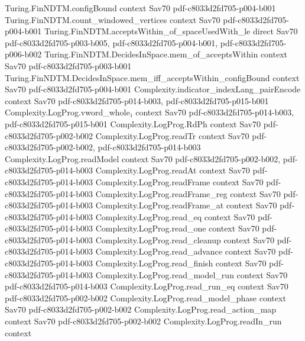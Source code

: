 \begin{theorem}
\proofstep
  {Turing.FinNDTM.configBound}
  {context}
  {Sav70}
  {pdf-c8033d2fd705-p004-b001}
\proofstep
  {Turing.FinNDTM.count_windowed_vertices}
  {context}
  {Sav70}
  {pdf-c8033d2fd705-p004-b001}
\proofstep
  {Turing.FinNDTM.acceptsWithin_of_spaceUsedWith_le}
  {direct}
  {Sav70}
  {pdf-c8033d2fd705-p003-b005,
    pdf-c8033d2fd705-p004-b001,
    pdf-c8033d2fd705-p006-b002}
\proofstep
  {Turing.FinNDTM.DecidesInSpace.mem_of_acceptsWithin}
  {context}
  {Sav70}
  {pdf-c8033d2fd705-p003-b001}
\proofstep
  {Turing.FinNDTM.DecidesInSpace.mem_iff_acceptsWithin_configBound}
  {context}
  {Sav70}
  {pdf-c8033d2fd705-p004-b001}
\proofstep
  {Complexity.indicator_indexLang_pairEncode}
  {context}
  {Sav70}
  {pdf-c8033d2fd705-p014-b003,
    pdf-c8033d2fd705-p015-b001}
\proofstep
  {Complexity.LogProg.vword_whole₁}
  {context}
  {Sav70}
  {pdf-c8033d2fd705-p014-b003,
    pdf-c8033d2fd705-p015-b001}
\proofstep
  {Complexity.LogProg.RdPh}
  {context}
  {Sav70}
  {pdf-c8033d2fd705-p002-b002}
\proofstep
  {Complexity.LogProg.readTr}
  {context}
  {Sav70}
  {pdf-c8033d2fd705-p002-b002,
    pdf-c8033d2fd705-p014-b003}
\proofstep
  {Complexity.LogProg.readModel}
  {context}
  {Sav70}
  {pdf-c8033d2fd705-p002-b002,
    pdf-c8033d2fd705-p014-b003}
\proofstep
  {Complexity.LogProg.readAt}
  {context}
  {Sav70}
  {pdf-c8033d2fd705-p014-b003}
\proofstep
  {Complexity.LogProg.readFrame}
  {context}
  {Sav70}
  {pdf-c8033d2fd705-p014-b003}
\proofstep
  {Complexity.LogProg.readFrame_reg}
  {context}
  {Sav70}
  {pdf-c8033d2fd705-p014-b003}
\proofstep
  {Complexity.LogProg.readFrame_at}
  {context}
  {Sav70}
  {pdf-c8033d2fd705-p014-b003}
\proofstep
  {Complexity.LogProg.read_eq}
  {context}
  {Sav70}
  {pdf-c8033d2fd705-p014-b003}
\proofstep
  {Complexity.LogProg.read_one}
  {context}
  {Sav70}
  {pdf-c8033d2fd705-p014-b003}
\proofstep
  {Complexity.LogProg.read_cleanup}
  {context}
  {Sav70}
  {pdf-c8033d2fd705-p014-b003}
\proofstep
  {Complexity.LogProg.read_advance}
  {context}
  {Sav70}
  {pdf-c8033d2fd705-p014-b003}
\proofstep
  {Complexity.LogProg.read_finish}
  {context}
  {Sav70}
  {pdf-c8033d2fd705-p014-b003}
\proofstep
  {Complexity.LogProg.read_model_run}
  {context}
  {Sav70}
  {pdf-c8033d2fd705-p014-b003}
\proofstep
  {Complexity.LogProg.read_run_eq}
  {context}
  {Sav70}
  {pdf-c8033d2fd705-p002-b002}
\proofstep
  {Complexity.LogProg.read_model_phase}
  {context}
  {Sav70}
  {pdf-c8033d2fd705-p002-b002}
\proofstep
  {Complexity.LogProg.read_action_map}
  {context}
  {Sav70}
  {pdf-c8033d2fd705-p002-b002}
\proofstep
  {Complexity.LogProg.readIn_run}
  {context}

\end{theorem}
